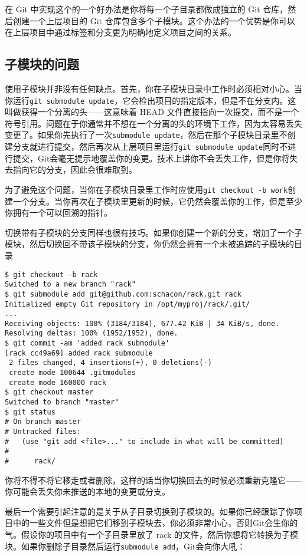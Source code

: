 \documentclass[a4paper]{book}
\begin{document}
在 Git 中实现这个的一个好办法是你将每一个子目录都做成独立的 Git 仓库，然后创建一个上层项目的 Git 仓库包含多个子模块。这个办法的一个优势是你可以在上层项目中通过标签和分支更为明确地定义项目之间的关系。

\subsection{子模块的问题}

使用子模块并非没有任何缺点。首先，你在子模块目录中工作时必须相对小心。当你运行\texttt{git submodule update}，它会检出项目的指定版本，但是不在分支内。这叫做获得一个分离的头------这意味着 HEAD 文件直接指向一次提交，而不是一个符号引用。问题在于你通常并不想在一个分离的头的环境下工作，因为太容易丢失变更了。如果你先执行了一次\texttt{submodule update}，然后在那个子模块目录里不创建分支就进行提交，然后再次从上层项目里运行\texttt{git submodule update}同时不进行提交，Git会毫无提示地覆盖你的变更。技术上讲你不会丢失工作，但是你将失去指向它的分支，因此会很难取到。

为了避免这个问题，当你在子模块目录里工作时应使用\texttt{git checkout -b work}创建一个分支。当你再次在子模块里更新的时候，它仍然会覆盖你的工作，但是至少你拥有一个可以回溯的指针。

切换带有子模块的分支同样也很有技巧。如果你创建一个新的分支，增加了一个子模块，然后切换回不带该子模块的分支，你仍然会拥有一个未被追踪的子模块的目录

\begin{shaded}\begin{verbatim}
$ git checkout -b rack
Switched to a new branch "rack"
$ git submodule add git@github.com:schacon/rack.git rack
Initialized empty Git repository in /opt/myproj/rack/.git/
...
Receiving objects: 100% (3184/3184), 677.42 KiB | 34 KiB/s, done.
Resolving deltas: 100% (1952/1952), done.
$ git commit -am 'added rack submodule'
[rack cc49a69] added rack submodule
 2 files changed, 4 insertions(+), 0 deletions(-)
 create mode 100644 .gitmodules
 create mode 160000 rack
$ git checkout master
Switched to branch "master"
$ git status
# On branch master
# Untracked files:
#   (use "git add <file>..." to include in what will be committed)
#
#      rack/
\end{verbatim}\end{shaded}

你将不得不将它移走或者删除，这样的话当你切换回去的时候必须重新克隆它------你可能会丢失你未推送的本地的变更或分支。

最后一个需要引起注意的是关于从子目录切换到子模块的。如果你已经跟踪了你项目中的一些文件但是想把它们移到子模块去，你必须非常小心，否则Git会生你的气。假设你的项目中有一个子目录里放了 rack 的文件，然后你想将它转换为子模块。如果你删除子目录然后运行\texttt{submodule add}，Git会向你大吼：
\end{document}
